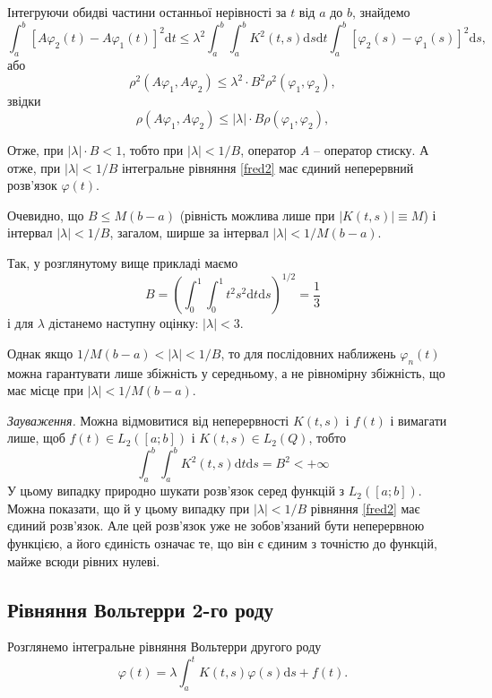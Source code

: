 \documentclass[14pt,twoside]{extreport}
\theoremstyle{mystyle}
\numberwithin{equation}{chapter}
\begin{document}
Інтегруючи обидві частини останньої нерівності за $t$ від $a$ до $b$, знайдемо
\[
 \int_{a}^{b}[A\varphi_2(t) - A\varphi_1(t)]^2 \mathrm{d}t \leqslant \lambda^2 \int_{a}^{b}\int_{a}^{b} K^2(t, s) \mathrm{d}s \mathrm{d}t \int_{a}^{b}[\varphi_2(s) - \varphi_1(s)]^2 \mathrm{d}s,
\]
або
\[
 \rho^2(A\varphi_1, A\varphi_2) \leqslant \lambda^2 \cdot B^2 \rho^2(\varphi_1, \varphi_2),
\]
звідки
\[
 \rho(A\varphi_1, A\varphi_2) \leqslant |\lambda| \cdot B \rho(\varphi_1, \varphi_2),
\]

Отже, при $|\lambda| \cdot B < 1$, тобто при $|\lambda| < 1/B$, оператор $A$ -- оператор стиску. А отже, при $|\lambda| < 1/B$ інтегральне рівняння \eqref{fred2} має єдиний неперервний розв'язок $\varphi(t)$.

Очевидно, що $B \leqslant M(b - a)$ (рівність можлива лише при $|K(t, s)| \equiv M$) і інтервал $|\lambda| < 1/B$, загалом, ширше за інтервал $|\lambda| < 1/M (b - a)$.

Так, у розглянутому вище прикладі маємо
\[
 B = \left(\int_0^1\int_0^1 t^2s^2 \mathrm{d}t\mathrm{d}s\right)^{1/2} = \dfrac{1}{3}
\]
і для $\lambda$ дістанемо наступну оцінку: $|\lambda| < 3$.

Однак якщо $1/M (b - a) < |\lambda| < 1/B$, то для послідовних наближень $\varphi_n(t)$ можна гарантувати лише збіжність у середньому, а не рівномірну збіжність, що має місце при $|\lambda| < 1/M(b-a)$.

\begin{small}
\emph{Зауваження.} Можна відмовитися від неперервності $K(t, s)$ і $f(t)$ і вимагати лише, щоб $f(t) \in L_2([a; b])$ і $K(t, s) \in L_2(Q)$, тобто
\[
 \int_{a}^{b}\int_{a}^{b} K^2(t, s) \mathrm{d}t \mathrm{d}s = B^2 < +\infty
\]
У цьому випадку природно шукати розв'язок серед функцій з $L_2([a; b])$. Можна показати, що й у цьому випадку при $|\lambda|< 1/B$ рівняння \eqref{fred2} має єдиний розв'язок. Але цей розв'язок уже не зобов'язаний бути неперервною функцією, а його єдиність означає те, що він є єдиним з точністю до функцій, майже всюди рівних нулеві.
\end{small}

\subsection{Рівняння Вольтерри 2-го роду}

Розглянемо інтегральне рівняння Вольтерри другого роду
\begin{equation}\label{volterra}
 \varphi(t) = \lambda \int_{a}^{t} K(t, s) \varphi(s) \mathrm{d}s + f(t).
\end{equation}
\end{document}
